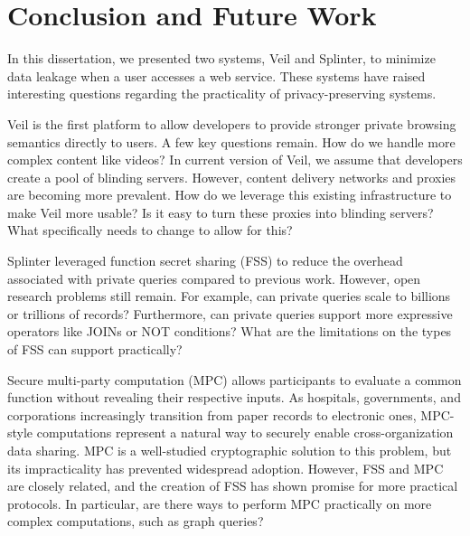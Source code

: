 \section{Conclusion and Future Work}
\label{chap:concl}

In this dissertation, we presented two systems, Veil and Splinter,
to minimize data leakage when a user accesses a web service. 
These systems have raised interesting questions
regarding the practicality of privacy-preserving systems.

Veil is the first platform to allow developers to provide stronger
private browsing semantics directly to users. A few key questions remain.
How do we handle more complex content like videos? In current version of Veil, we assume
that developers create a pool of blinding servers. However, content delivery
networks and proxies are becoming more prevalent. How do we leverage this
existing infrastructure to make Veil more usable? Is it easy to turn
these proxies into blinding servers? What specifically needs to change to allow
for this? 

Splinter leveraged
function secret sharing (FSS) to reduce the overhead associated with private queries compared to previous
work. However, open research problems still remain. For example, can private queries scale to billions
or trillions of records? Furthermore, can private queries support more expressive operators like JOINs or
NOT conditions? What are the limitations on the types of FSS can support practically?

Secure multi-party computation (MPC) allows participants to evaluate a common function without revealing
their respective inputs. As hospitals, governments, and corporations increasingly transition from
paper records to electronic ones, MPC-style computations represent a natural way to securely enable
cross-organization data sharing. MPC is a well-studied cryptographic solution to this problem, but its
impracticality has prevented widespread adoption. However, FSS and MPC are closely related, and 
the creation of FSS has shown promise for more practical protocols. In particular,
are there ways to perform MPC practically on more complex computations, such as graph queries?



